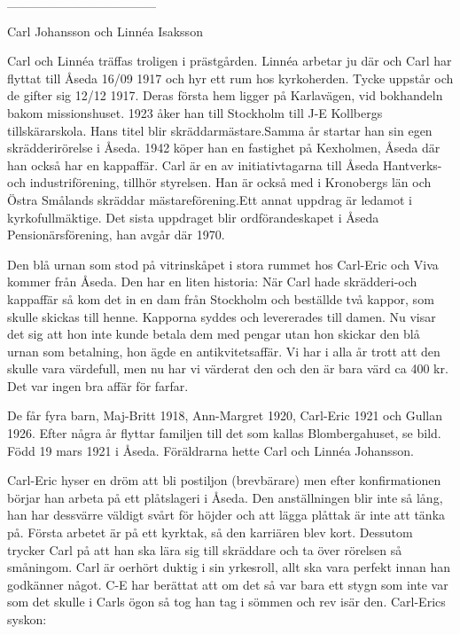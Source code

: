 ________________












Carl Johansson och Linnéa Isaksson


Carl och Linnéa träffas troligen i prästgården. Linnéa arbetar ju där och Carl har flyttat till Åseda 16/09 1917 och hyr ett rum hos kyrkoherden. Tycke uppstår och de gifter sig 12/12 1917. Deras första hem ligger på Karlavägen, vid bokhandeln bakom missionshuset.
1923 åker han till Stockholm till J-E Kollbergs tillskärarskola. Hans titel blir skräddarmästare.Samma år startar han sin egen skrädderirörelse i Åseda. 1942 köper han en fastighet på Kexholmen, Åseda där han också har en kappaffär. Carl är en av initiativtagarna till Åseda Hantverks-och industriförening, tillhör styrelsen. Han är också med i Kronobergs län och Östra Smålands skräddar mästareförening.Ett annat uppdrag är ledamot i kyrkofullmäktige. Det sista uppdraget blir ordförandeskapet i Åseda Pensionärsförening, han avgår där 1970.


Den blå urnan som stod på vitrinskåpet i stora rummet hos Carl-Eric och Viva kommer från Åseda. Den har en liten historia: När Carl hade skrädderi-och kappaffär så kom det in en dam från Stockholm och beställde två kappor, som skulle skickas till henne. Kapporna syddes och levererades till damen. Nu visar det sig att hon inte kunde betala dem med pengar utan hon skickar den blå urnan som betalning, hon ägde en antikvitetsaffär. Vi har i alla år trott att den skulle vara värdefull, men nu har vi värderat den och den är bara värd ca 400 kr. Det var ingen bra affär för farfar.


 De får fyra barn, Maj-Britt 1918, Ann-Margret 1920, Carl-Eric 1921 och Gullan 1926. Efter några år flyttar familjen till det som kallas Blombergahuset, se bild.
Född 19 mars 1921 i Åseda. Föräldrarna hette Carl och Linnéa Johansson.  


Carl-Eric hyser en dröm att bli postiljon (brevbärare) men efter konfirmationen börjar han arbeta på ett plåtslageri i Åseda. Den anställningen blir inte så lång, han har dessvärre väldigt svårt för höjder och att lägga plåttak är inte att tänka på. Första arbetet är på ett kyrktak, så den karriären blev kort. Dessutom trycker  Carl på att han ska lära sig till skräddare och ta över rörelsen så småningom. Carl är oerhört duktig i sin yrkesroll, allt ska vara perfekt innan han godkänner något. C-E har berättat att om det så var bara ett stygn som inte var som det skulle i Carls ögon så tog han tag i sömmen och rev isär den.
Carl-Erics syskon:


